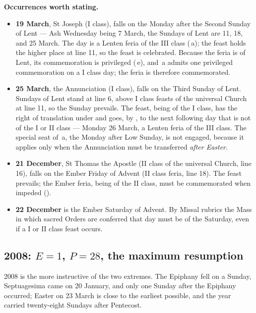 \textbf{Occurrences worth stating.}

\begin{itemize}[leftmargin=1.3em, itemsep=0.25em]
\item \textbf{19 March}, St Joseph (I class), falls on the Monday after the Second Sunday of Lent
— Ash Wednesday being 7 March, the Sundays of Lent are 11, 18, and 25 March.
The day is a Lenten feria of the III class (\,a); the feast holds the higher place at line
11, so the feast is celebrated. Because the feria is of Lent, its commemoration is privileged
(\,e), and \,a admits one privileged commemoration on a I class day; the feria is
therefore commemorated.
\item \textbf{25 March}, the Annunciation (I class), falls on the Third Sunday of Lent. Sundays
of Lent stand at line 6, above I class feasts of the universal Church at line 11, so the Sunday
prevails. The feast, being of the I class, has the right of translation under  and goes,
by , to the next following day that is not of the I or II class — Monday 26 March, a
Lenten feria of the III class. The special seat of \,a, the Monday after Low Sunday, is
not engaged, because it applies only when the Annunciation must be transferred \emph{after
Easter}.
\item \textbf{21 December}, St Thomas the Apostle (II class of the universal Church, line 16),
falls on the Ember Friday of Advent (II class feria, line 18). The feast prevails; the Ember
feria, being of the II class, must be commemorated when impeded ().
\item \textbf{22 December} is the Ember Saturday of Advent. By Missal rubrics  the Mass
in which sacred Orders are conferred that day must be of the Saturday, even if a I or II class
feast occurs.
\end{itemize}

\subsection{2008: $E = 1$, $P = 28$, the maximum resumption}

2008 is the more instructive of the two extremes. The Epiphany fell on a Sunday, Septuagesima
came on 20 January, and only one Sunday after the Epiphany occurred; Easter on 23 March is close
to the earliest possible, and the year carried twenty-eight Sundays after Pentecost.

